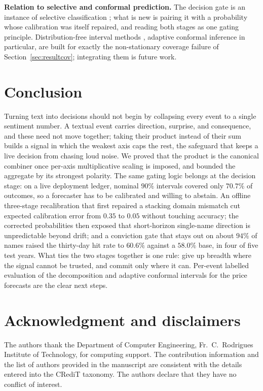 \documentclass{elektr}
\begin{document}
\textbf{Relation to selective and conformal prediction.} The decision gate is an instance of selective classification \cite{chow1970,geifman2017}; what is new is pairing it with a probability whose calibration was itself repaired, and reading both stages as one gating principle. Distribution-free interval methods \cite{angelopoulos2021,gibbs2021,zaffran2022}, adaptive conformal inference in particular, are built for exactly the non-stationary coverage failure of Section~\ref{sec:resultcov}; integrating them is future work.

\section{Conclusion}
\label{sec:conclusion}
Turning text into decisions should not begin by collapsing every event to a single sentiment number. A textual event carries direction, surprise, and consequence, and these need not move together; taking their product instead of their sum builds a signal in which the weakest axis caps the rest, the safeguard that keeps a live decision from chasing loud noise. We proved that the product is the canonical combiner once per-axis multiplicative scaling is imposed, and bounded the aggregate by its strongest polarity. The same gating logic belongs at the decision stage: on a live deployment ledger, nominal $90\%$ intervals covered only $70.7\%$ of outcomes, so a forecaster has to be calibrated and willing to abstain. An offline three-stage recalibration that first repaired a stacking domain mismatch cut expected calibration error from $0.35$ to $0.05$ without touching accuracy; the corrected probabilities then exposed that short-horizon single-name direction is unpredictable beyond drift; and a conviction gate that stays out on about $94\%$ of names raised the thirty-day hit rate to $60.6\%$ against a $58.0\%$ base, in four of five test years. What ties the two stages together is one rule: give up breadth where the signal cannot be trusted, and commit only where it can. Per-event labelled evaluation of the decomposition and adaptive conformal intervals for the price forecasts are the clear next steps.

\section*{Acknowledgment and disclaimers}
The authors thank the Department of Computer Engineering, Fr.\ C.\ Rodrigues Institute of Technology, for computing support. The contribution information and the list of authors provided in the manuscript are consistent with the details entered into the CRediT taxonomy. The authors declare that they have no conflict of interest.
\end{document}
